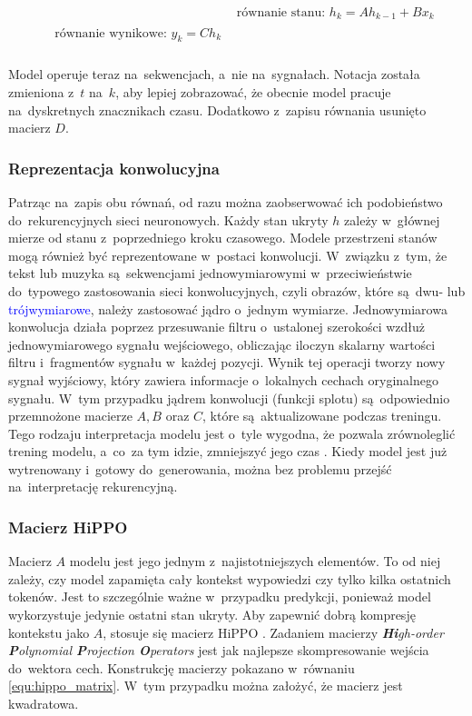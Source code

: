 \documentclass[data-science]{agh-wi} %
\begin{document}
\begin{align}
     & \text{równanie stanu: }h_k = Ah_{k-1} + Bx_k \label{equ:rownanie_stanu_seq} \\
    \begin{split}
        &\text{równanie wynikowe: }y_k = Ch_k \label{equ:rownanie_wynikowe_seq} \\
    \end{split}
\end{align}

Model operuje teraz na~sekwencjach, a~nie na~sygnałach. Notacja została zmieniona z~$t$ na~$k$, aby lepiej zobrazować, że obecnie model pracuje na~dyskretnych znacznikach czasu. Dodatkowo z~zapisu równania usunięto macierz $D$.

\subsubsection*{Reprezentacja konwolucyjna}
Patrząc na~zapis obu równań, od razu można zaobserwować ich podobieństwo do~rekurencyjnych sieci neuronowych. Każdy stan ukryty $h$ zależy w~głównej mierze od stanu z~poprzedniego kroku czasowego. Modele przestrzeni stanów mogą również być reprezentowane w~postaci konwolucji. W~związku z~tym, że tekst lub muzyka są~sekwencjami jednowymiarowymi w~przeciwieństwie do~typowego zastosowania sieci konwolucyjnych, czyli obrazów, które są~dwu- lub \textcolor{blue}{trójwymiarowe}, należy zastosować jądro o~jednym wymiarze.  Jednowymiarowa konwolucja działa poprzez przesuwanie filtru o~ustalonej szerokości wzdłuż jednowymiarowego sygnału wejściowego, obliczając iloczyn skalarny wartości filtru i~fragmentów sygnału w~każdej pozycji. Wynik tej operacji tworzy nowy sygnał wyjściowy, który zawiera informacje o~lokalnych cechach oryginalnego sygnału. W~tym przypadku jądrem konwolucji (funkcji splotu) są~odpowiednio przemnożone macierze $A, B$ oraz $C$, które są~aktualizowane podczas treningu. Tego rodzaju interpretacja modelu jest o~tyle wygodna, że pozwala zrównoleglić trening modelu, a~co~za tym idzie, zmniejszyć jego czas \cite{ssm_notacja}. Kiedy model jest już wytrenowany i~gotowy do~generowania, można bez problemu przejść na~interpretację rekurencyjną.

\subsubsection*{Macierz HiPPO}
Macierz $A$ modelu jest jego jednym z~najistotniejszych elementów. To od niej zależy, czy model zapamięta cały kontekst wypowiedzi czy tylko kilka ostatnich tokenów. Jest to szczególnie ważne w~przypadku predykcji, ponieważ model wykorzystuje jedynie ostatni stan ukryty. Aby zapewnić dobrą kompresję kontekstu jako $A$, stosuje się macierz HiPPO \cite{hippo}. Zadaniem macierzy \textit{\textbf{Hi}gh-order \textbf{P}olynomial \textbf{P}rojection \textbf{O}perators} jest jak najlepsze skompresowanie wejścia do~wektora cech. Konstrukcję macierzy pokazano w~równaniu \ref*{equ:hippo_matrix}. W~tym przypadku można założyć, że macierz jest kwadratowa.
\end{document}
